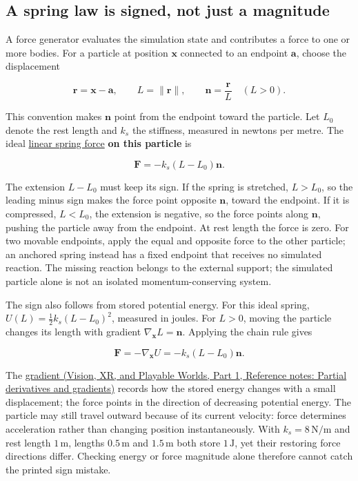 \subsection{A spring law is signed, not just a magnitude}\label{06-engine-ii-ch047-a-spring-law-is-signed-not-just-a-magnitude}

\hypertarget{06-engine-ii-ch047-a-spring-law-is-signed-not-just-a-magnitude}{}

A force generator evaluates the simulation state and contributes a force to one or more bodies. For a particle at position \(\mathbf{x}\) connected to an endpoint \(\mathbf{a}\), choose the displacement

\[
\mathbf{r}=\mathbf{x}-\mathbf{a},\qquad
L=\|\mathbf r\|,\qquad
\mathbf n=\frac{\mathbf r}{L}\quad(L>0).
\]

This convention makes \(\mathbf n\) point from the endpoint toward the particle. Let \(L_0\) denote the rest length and \(k_s\) the stiffness, measured in newtons per metre. The ideal \hyperref[appendix-e040e2108923]{linear spring force} \textbf{on this particle} is

\[
\mathbf F=-k_s(L-L_0)\mathbf n.
\]

The extension \(L-L_0\) must keep its sign. If the spring is stretched, \(L>L_0\), so the leading minus sign makes the force point opposite \(\mathbf n\), toward the endpoint. If it is compressed, \(L<L_0\), the extension is negative, so the force points along \(\mathbf n\), pushing the particle away from the endpoint. At rest length the force is zero. For two movable endpoints, apply the equal and opposite force to the other particle; an anchored spring instead has a fixed endpoint that receives no simulated reaction. The missing reaction belongs to the external support; the simulated particle alone is not an isolated momentum-conserving system.

The sign also follows from stored potential energy. For this ideal spring, \(U(L)=\tfrac12k_s(L-L_0)^2\), measured in joules. For \(L>0\), moving the particle changes its length with gradient \(\nabla_{\mathbf x}L=\mathbf n\). Applying the chain rule gives

\[
\mathbf F=-\nabla_{\mathbf x}U=-k_s(L-L_0)\mathbf n.
\]

The \href{../07-Vision-XR-and-Playable-Worlds-P01/main.pdf\#nameddest=appendix-677b59746ae0}{gradient (Vision, XR, and Playable Worlds, Part 1, Reference notes: Partial derivatives and gradients)} records how the stored energy changes with a small displacement; the force points in the direction of decreasing potential energy. The particle may still travel outward because of its current velocity: force determines acceleration rather than changing position instantaneously. With \(k_s=8\,\mathrm{N/m}\) and rest length \(1\,\mathrm m\), lengths \(0.5\,\mathrm m\) and \(1.5\,\mathrm m\) both store \(1\,\mathrm J\), yet their restoring force directions differ. Checking energy or force magnitude alone therefore cannot catch the printed sign mistake.

